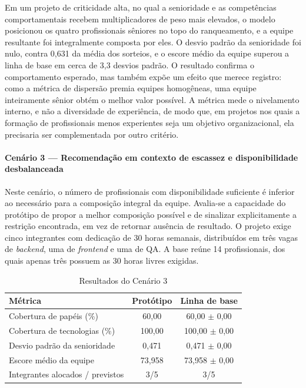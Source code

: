 Em um projeto de criticidade alta, no qual a senioridade e as competências comportamentais recebem multiplicadores de peso mais elevados, o modelo posicionou os quatro profissionais sêniores no topo do ranqueamento, e a equipe resultante foi integralmente composta por eles. O desvio padrão da senioridade foi nulo, contra 0,631 da média dos sorteios, e o escore médio da equipe superou a linha de base em cerca de 3,3 desvios padrão. O resultado confirma o comportamento esperado, mas também expõe um efeito que merece registro: como a métrica de dispersão premia equipes homogêneas, uma equipe inteiramente sênior obtém o melhor valor possível. A métrica mede o nivelamento interno, e não a diversidade de experiência, de modo que, em projetos nos quais a formação de profissionais menos experientes seja um objetivo organizacional, ela precisaria ser complementada por outro critério.

\paragraph{Cenário 3 — Recomendação em contexto de escassez e disponibilidade desbalanceada}

Neste cenário, o número de profissionais com disponibilidade suficiente é inferior ao necessário para a composição integral da equipe. Avalia-se a capacidade do protótipo de propor a melhor composição possível e de sinalizar explicitamente a restrição encontrada, em vez de retornar ausência de resultado. O projeto exige cinco integrantes com dedicação de 30 horas semanais, distribuídos em três vagas de \textit{backend}, uma de \textit{frontend} e uma de QA. A base reúne 14 profissionais, dos quais apenas três possuem as 30 horas livres exigidas.

\begin{table}[htbp]
\centering
\caption{Resultados do Cenário 3}
\label{tab:cenario3}
\begin{tabular}{lcc}
\hline
\textbf{Métrica} & \textbf{Protótipo} & \textbf{Linha de base} \\
\hline
Cobertura de papéis (\%) & 60,00 & 60,00 $\pm$ 0,00 \\
Cobertura de tecnologias (\%) & 100,00 & 100,00 $\pm$ 0,00 \\
Desvio padrão da senioridade & 0,471 & 0,471 $\pm$ 0,00 \\
Escore médio da equipe & 73,958 & 73,958 $\pm$ 0,00 \\
Integrantes alocados / previstos & 3/5 & 3/5 \\
\hline
\end{tabular}
\end{table}

